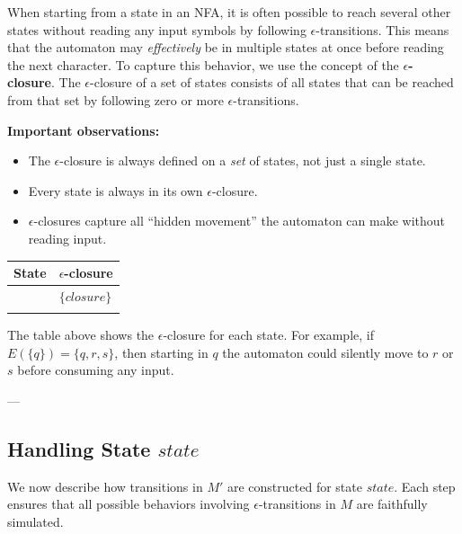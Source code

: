 {{{{{{{{{{{When starting from a state in an NFA, it is often possible to reach several other states without reading any input symbols by following $\epsilon$-transitions. This means that the automaton may \emph{effectively} be in multiple states at once before reading the next character. To capture this behavior, we use the concept of the \textbf{$\epsilon$-closure}. The $\epsilon$-closure of a set of states consists of all states that can be reached from that set by following zero or more $\epsilon$-transitions.

\textbf{Important observations:}
\begin{itemize}[itemsep=0.3em]
    \item The $\epsilon$-closure is always defined on a \emph{set} of states, not just a single state.
    \item Every state is always in its own $\epsilon$-closure.
    \item $\epsilon$-closures capture all ``hidden movement'' the automaton can make without reading input.
\end{itemize}

{%
\begin{center}
\setlength{\tabcolsep}{12pt}
\renewcommand{\arraystretch}{1.1}
\begin{tabular}{c|l}
\textbf{State} & $\epsilon$-closure \\\hline
{%
{{ state }} & $\{ {{ closure }} \}$ \\\hline
{%
\end{tabular}
\end{center}
{%

The table above shows the $\epsilon$-closure for each state. For example, if $E(\{q\}) = \{q, r, s\}$, then starting in $q$ the automaton could silently move to $r$ or $s$ before consuming any input.

---

{%
\subsection*{Handling State ${{ state }}$}

We now describe how transitions in $M'$ are constructed for state ${{ state }}$. Each step ensures that
all possible behaviors involving $\epsilon$-transitions in $M$ are faithfully simulated.

\begin{enumerate}[itemsep=0.4em]


\end{enumerate}}}}}}}}}}}}}}}
